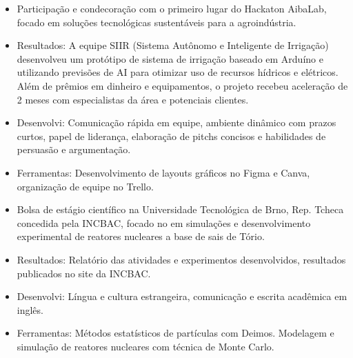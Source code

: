 \documentclass[10pt,a4paper,ragged2e]{altacv}
\begin{document}
\begin{itemize}

\item Participação e condecoração com o primeiro lugar do Hackaton AibaLab, focado em soluções tecnológicas sustentáveis para a agroindústria. 
\item Resultados: A equipe SIIR (Sistema Autônomo e Inteligente de Irrigação) desenvolveu um protótipo de sistema de irrigação baseado em Arduíno e utilizando previsões de AI para otimizar uso de recursos hídricos e elétricos. Além de prêmios em dinheiro e equipamentos, o projeto recebeu aceleração de 2 meses com especialistas da área e potenciais clientes.\\
\item Desenvolvi: Comunicação rápida em equipe, ambiente dinâmico com prazos curtos, papel de liderança, elaboração de pitchs concisos e habilidades de persuasão e argumentação.
\item Ferramentas: Desenvolvimento de layouts gráficos no Figma e Canva, organização de equipe no Trello.\\

\end{itemize}

\divider

\begin{itemize}

\item Bolsa de estágio científico na Universidade Tecnológica de Brno, Rep. Tcheca concedida pela INCBAC, focado no em simulações e desenvolvimento experimental de reatores nucleares a base de sais de Tório.\\
\item Resultados: Relatório das atividades e experimentos desenvolvidos, resultados publicados no site da INCBAC.
\item Desenvolvi: Língua e cultura estrangeira, comunicação e escrita acadêmica em inglês.\\
\item Ferramentas: Métodos estatísticos de partículas com Deimos. Modelagem e simulação de reatores nucleares com técnica de Monte Carlo.


\end{itemize}

\end{document}
